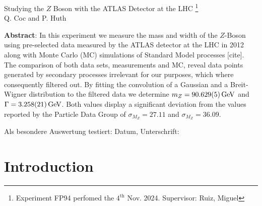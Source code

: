 \documentclass[11 pt]{article}
\begin{document}
\thispagestyle{empty}     %
\null\vspace{40mm}
\begin{center}
{%
\Large  
Studying the $Z$ Boson with the ATLAS Detector at the LHC \footnote{\noindent Experiment FP94 perfomed the $4^{\textrm{th}}$ Nov. 2024. Supervisor:	Ruiz, Miguel}
}\\[15mm]
Q. Coc and P. Huth

\vspace{25mm}

\parbox{0.9\textwidth}{
\textbf{Abstract}:    
\small 
In this experiment we measure the mass and width of the $Z$-Boson using pre-selected data measured by the ATLAS detector at the LHC in 2012 along with Monte Carlo (MC) simulations of Standard Model processes [cite]. The comparison of both data sets, measurements and MC, reveal data points generated by secondary processes irrelevant for our purposes, which where consequently filtered out. By fitting the convolution of a Gaussian and a Breit-Wigner distribution to the filtered data we determine $m_{Z} = \SI{90.629\pm 0.005}{\giga\electronvolt}$ and $\Gamma = \SI{3.258\pm 0.021}{\giga\electronvolt}$. Both values display a significant deviation from the values reported by the Particle Data Group \footnotemark of $\sigma_{M_Z} = 27.11$ and $\sigma_{M_Z} = 36.09$.
}
\end{center}
\vfill
Als besondere Auswertung testiert: Datum, Unterschrift:
\vspace{20mm}

\newpage  
\null\thispagestyle{empty} 

\newpage
{}

\section{Introduction}
%
\end{document}
